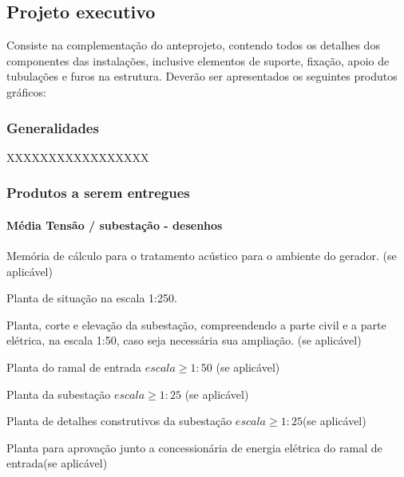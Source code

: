 \subsection{Projeto executivo} \label{subsection: etapa-PE}

Consiste na complementação do anteprojeto, contendo todos os detalhes dos componentes das instalações, inclusive elementos de suporte, fixação, apoio de tubulações e furos na estrutura. Deverão ser apresentados os seguintes produtos gráficos:
\subsubsection{Generalidades}
XXXXXXXXXXXXXXXXX

\subsubsection{Produtos a serem entregues}

\paragraph{Média Tensão / subestação - desenhos}
	\item Memória de cálculo para o tratamento acústico para o ambiente do gerador. (se aplicável)

	\item Planta de situação na escala 1:250.

	\item Planta, corte e elevação da subestação, compreendendo a parte civil e a parte elétrica, na escala 1:50, caso seja necessária sua ampliação. (se aplicável)
	
	\item Planta do ramal de entrada $escala \geq 1:50$ (se aplicável)
	
	\item Planta da subestação $escala \geq 1:25$ (se aplicável)
	
	\item Planta de detalhes construtivos da subestação $escala \geq 1:25$(se aplicável)
	
	\item Planta para aprovação junto a concessionária de energia elétrica do ramal de entrada(se aplicável)
	

